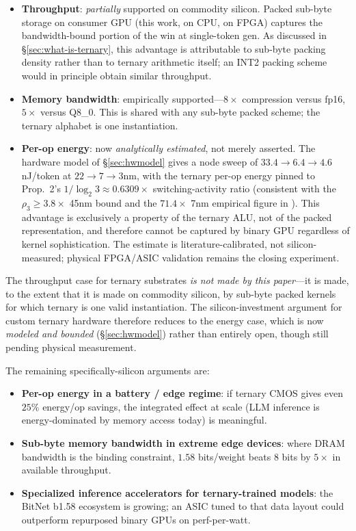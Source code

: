 \documentclass{article}
\begin{document}
\begin{itemize}
  \item \textbf{Throughput}: \emph{partially} supported on commodity
    silicon. Packed sub-byte storage on consumer {GPU} (this work,
    \cite{tmac-eurosys-2025} on {CPU}, \cite{lutmul-aspdac-2025} on
    {FPGA}) captures the bandwidth-bound portion of the win at
    single-token gen. As discussed in \S\ref{sec:what-is-ternary}, this
    advantage is attributable to sub-byte packing density rather than
    to ternary arithmetic itself; an {INT2} packing scheme would in
    principle obtain similar throughput.
  \item \textbf{Memory bandwidth}: empirically supported---$8\times$
    compression versus fp16, $5\times$ versus Q8\_0. This is shared
    with any sub-byte packed scheme; the ternary alphabet is one
    instantiation.
  \item \textbf{Per-op energy}: now \emph{analytically estimated}, not
    merely asserted. The hardware model of \S\ref{sec:hwmodel} gives a
    node sweep of $33.4 \to 6.4 \to 4.6$ nJ/token at $22 \to 7 \to 3$nm,
    with the ternary per-op energy pinned to \citet{cuevas-formal-2026}
    Prop.~2's $1/\log_2 3 \approx 0.6309\times$ switching-activity ratio
    (consistent with the $\rho_3 \geq 3.8\times$ 45nm bound and the
    $71.4\times$ 7nm empirical figure in \citep{bitnet158-2024}). This
    advantage is exclusively a property of the ternary {ALU}, not of the
    packed representation, and therefore cannot be captured by binary
    {GPU} regardless of kernel sophistication. The estimate is
    literature-calibrated, not silicon-measured; physical {FPGA}/{ASIC}
    validation remains the closing experiment.
\end{itemize}

The throughput case for ternary substrates \emph{is not made by this
paper}---it is made, to the extent that it is made on commodity
silicon, by sub-byte packed kernels for which ternary is one valid
instantiation. The silicon-investment argument for custom ternary
hardware therefore reduces to the energy case, which is now
\emph{modeled and bounded} (\S\ref{sec:hwmodel}) rather than entirely
open, though still pending physical measurement.

The remaining specifically-silicon arguments are:

\begin{itemize}
  \item \textbf{Per-op energy in a battery / edge regime}: if ternary
    {CMOS} gives even $25\%$ energy/op savings, the integrated effect at
    scale ({LLM} inference is energy-dominated by memory access today)
    is meaningful.
  \item \textbf{Sub-byte memory bandwidth in extreme edge devices}:
    where {DRAM} bandwidth is the binding constraint, $1.58$ bits/weight
    beats $8$ bits by $5\times$ in available throughput.
  \item \textbf{Specialized inference accelerators for ternary-trained
    models}: the BitNet b1.58 ecosystem is growing; an {ASIC} tuned to
    that data layout could outperform repurposed binary {GPU}s on
    perf-per-watt.
\end{itemize}
\end{document}
